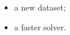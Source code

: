 \documentclass{article}
\begin{document}
\begin{itemize}
  Our contributions are:
  \item a new dataset;
  \item a faster solver.
\end{itemize}
\end{document}
